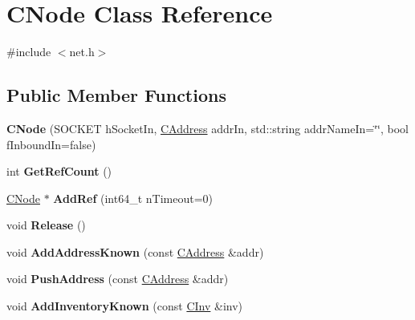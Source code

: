 \hypertarget{class_c_node}{}\section{C\+Node Class Reference}
\label{class_c_node}


{\ttfamily \#include $<$net.\+h$>$}

\subsection*{Public Member Functions}
\begin{DoxyCompactItemize}
\item 
\mbox{\label{class_c_node_a51556705550511146245b9fb2fec09c1}} 
{\bfseries C\+Node} (S\+O\+C\+K\+ET h\+Socket\+In, \mbox{\hyperlink{class_c_address}{C\+Address}} addr\+In, std\+::string addr\+Name\+In=\char`\"{}\char`\"{}, bool f\+Inbound\+In=false)
\item 
\mbox{\label{class_c_node_a72211aaf51af2e981e6b8a1deb73c836}} 
int {\bfseries Get\+Ref\+Count} ()
\item 
\mbox{\label{class_c_node_a9d2bbaebcfbb305e3727c5ab57745fff}} 
\mbox{\hyperlink{class_c_node}{C\+Node}} $\ast$ {\bfseries Add\+Ref} (int64\+\_\+t n\+Timeout=0)
\item 
\mbox{\label{class_c_node_af804bf7c7f9794e80a3b916e1befece9}} 
void {\bfseries Release} ()
\item 
\mbox{\label{class_c_node_a1d2cecdd03c9da642d292f6a81ac6ed8}} 
void {\bfseries Add\+Address\+Known} (const \mbox{\hyperlink{class_c_address}{C\+Address}} \&addr)
\item 
\mbox{\label{class_c_node_a06950a5ce265a1d4df1aad7f28e6fde8}} 
void {\bfseries Push\+Address} (const \mbox{\hyperlink{class_c_address}{C\+Address}} \&addr)
\item 
\mbox{\label{class_c_node_ac3054eb6ade84e8968f032ce3e700f6a}} 
void {\bfseries Add\+Inventory\+Known} (const \mbox{\hyperlink{class_c_inv}{C\+Inv}} \&inv)
\item 
\mbox{\label{class_c_node_a7cef2333aa8776127a7e7fcab659eb6a}} 

\end{DoxyCompactItemize}
